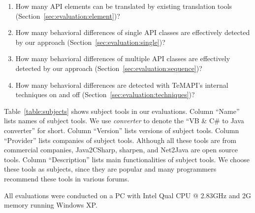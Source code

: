 \vspace*{-1.5ex}
\begin{enumerate}
\item How many API elements can be translated by existing translation tools (Section~\ref{sec:evaluation:element})? \vspace*{-1.8ex}
\item How many behavioral differences of single API classes are effectively detected by our approach (Section~\ref{sec:evaluation:single})?\vspace*{-1.8ex}
\item How many behavioral differences of multiple API classes are effectively detected by our approach (Section~\ref{sec:evaluation:sequence})?\vspace*{-1.8ex}
\item How many behavioral differences are detected with TeMAPI's internal techniques on and off (Section~\ref{sec:evaluation:techniques})?
\end{enumerate}\vspace*{-1.5ex}

Table~\ref{table:subjects} shows subject tools in our evaluations. Column ``Name'' lists names of subject tools. We use \emph{converter} to denote the ``VB \& C\# to Java converter'' for short. Column ``Version'' lists versions of subject tools. Column ``Provider'' lists companies of subject tools. Although all these tools are from commercial companies, Java2CSharp, sharpen, and Net2Java are open source tools. Column ``Description'' lists main functionalities of subject tools. We choose these tools as subjects, since they are popular and many programmers recommend these tools in various forums.

All evaluations were conducted on a PC with Intel Qual CPU @ 2.83GHz and 2G memory running Windows XP.

